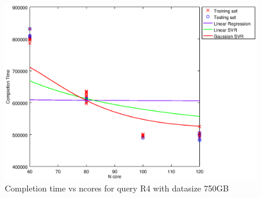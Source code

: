 
\begin {figure}[hbtp]
\centering
\includegraphics[width=\textwidth]{output/R4_750_1_OVER_NCORES/plot_R4_750_bestmodels.eps}
\caption{Completion time vs ncores for query R4 with datasize 750GB}
\label{fig:all_nonlinear_R4_750}
\end {figure}
